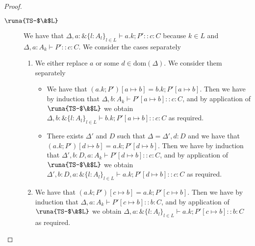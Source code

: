 \begin{lemma}
\begin{proof}
\begin{description}
\item[$\runa{TS-$\&$L}$] We have that $\Delta,a : \&\{l:A_l\}_{l\in L}\vdash a.k; P' :: c\!:\!C$ because $k \in L$ and $\Delta,a:A_k \vdash P' :: c\!:\!C$. We consider the cases separately
\begin{enumerate}
    \item We either replace $a$ or some $d\in\text{dom}(\Delta)$. We consider them separately
    \begin{itemize}
        \item We have that $(a.k; P')[a\mapsto b]=b.k; P'[a\mapsto b]$. Then we have by induction that $\Delta,b:A_k\vdash P'[a\mapsto b] :: c\!:\!C$, and by application of $\runa{TS-$\&$L}$ we obtain $\Delta,b:\&\{l:A_l\}_{l\in L}\vdash b.k; P'[a\mapsto b] :: c\!:\!C$ as required.
        
        \item There exists $\Delta'$ and $D$ such that $\Delta=\Delta',d:D$ and we have that $(a.k; P')[d\mapsto b]=a.k; P'[d\mapsto b]$. Then we have by induction that $\Delta',b:D,a:A_k\vdash P'[d\mapsto b] :: c\!:\!C$, and by application of $\runa{TS-$\&$L}$ we obtain $\Delta',b:D,a:\&\{l:A_l\}_{l\in L}\vdash a.k; P'[d\mapsto b] :: c\!:\!C$ as required.
    \end{itemize}
    
    \item We have that $(a.k; P')[c\mapsto b]=a.k; P'[c\mapsto b]$. Then we have by induction that $\Delta,a:A_k\vdash P'[c\mapsto b] :: b\!:\!C$, and by application of $\runa{TS-$\&$L}$ we obtain $\Delta,a:\&\{l:A_l\}_{l\in L}\vdash a.k; P'[c\mapsto b] :: b\!:\!C$ as required.
\end{enumerate}



\end{description}
\end{proof}
\end{lemma}
